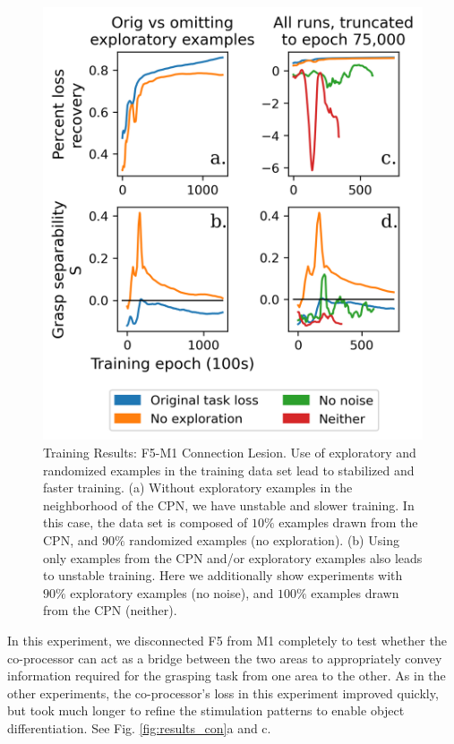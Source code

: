 \documentclass[12pt]{iopart}
\begin{document}
\begin{figure}[h]
\centering
\includegraphics[scale=1]{training_results_no_explore.png}
\caption{Training Results: F5-M1 Connection Lesion. Use of exploratory
         and randomized examples in the training data set lead to stabilized
         and faster training. (a) Without exploratory examples in the
         neighborhood of the CPN, we have unstable and slower training. In
         this case, the data set is composed of $10\%$ examples drawn from the
         CPN, and $90\%$ randomized examples (no exploration).
         (b) Using only examples from the CPN and/or exploratory examples also
         leads to unstable training. Here we additionally show experiments with
         $90\%$ exploratory examples (no noise), and $100\%$ examples drawn from
         the CPN (neither).}
\label{fig:results_con_no_explore}
\end{figure}

In this experiment, we disconnected F5 from M1 completely to test whether the co-processor can
act as a bridge between the two areas to appropriately convey information required for the grasping
task from one area to the other. As in the other experiments, the co-processor's loss in this experiment
improved quickly, but took much longer to refine the stimulation patterns to enable 
object differentiation. See Fig. \ref{fig:results_con}a and c.
\end{document}
